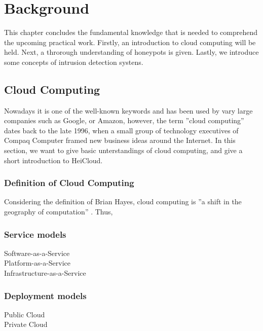 \chapter{Background}

This chapter concludes the fundamental knowledge that is needed to comprehend the upcoming practical work. Firstly, an introduction to cloud computing will be held. Next, a throrough understanding of honeypots is given. Lastly, we introduce some concepts of intrusion detection systens.

\section{Cloud Computing}

Nowadays it is one of the well-known keywords and has been used by vary large companies such as Google, or Amazon, however, the term ''cloud computing'' dates back to the late 1996, when a small group of technology executives of Compaq Computer framed new business ideas around the Internet.\cite{regalado2020} In this section, we want to give basic unterstandings of cloud computing, and give a short introduction to HeiCloud.

\subsection{Definition of Cloud Computing}

Considering the definition of Brian Hayes, cloud computing is ''a shift in the geography of computation'' \cite{hayes2008}. Thus, 

\subsection{Service models}

Software-as-a-Service\\

Platform-as-a-Service\\

Infrastructure-as-a-Service\\

\subsection{Deployment models}

Public Cloud\\

Private Cloud\\

